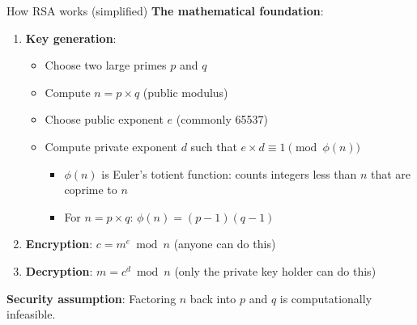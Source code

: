 \ifdefined\PRESENTATION\else\PassOptionsToClass{handout}{beamer}\fi\documentclass[aspectratio=169, lualatex]{beamer}
\begin{document}
\begin{frame}{How RSA works (simplified)}
	\textbf{The mathematical foundation}:
	\begin{enumerate}[<+->]
		\item \textbf{Key generation}:
		      \begin{itemize}
			      \item Choose two large primes $p$ and $q$
			      \item Compute $n = p \times q$ (public modulus)
			      \item Choose public exponent $e$ (commonly 65537)
			      \item Compute private exponent $d$ such that $e \times d \equiv 1 \pmod{\phi(n)}$
			            \begin{itemize}
				            \item $\phi(n)$ is Euler's totient function: counts integers less than $n$ that are coprime to $n$
				            \item For $n = p \times q$: $\phi(n) = (p-1)(q-1)$
			            \end{itemize}
		      \end{itemize}
		\item \textbf{Encryption}: $c = m^e \bmod n$ (anyone can do this)
		\item \textbf{Decryption}: $m = c^d \bmod n$ (only the private key holder can do this)
	\end{enumerate}
	\vspace{0.5cm}
	\textbf{Security assumption}: Factoring $n$ back into $p$ and $q$ is computationally infeasible.
\end{frame}
\end{document}
